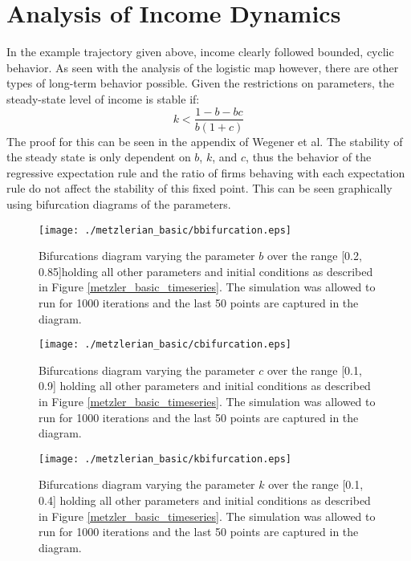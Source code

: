 \section{Analysis of Income Dynamics}
In the example trajectory given above, income clearly followed bounded, cyclic behavior. As seen with the analysis of the logistic map however, there are other types of long-term behavior possible. Given the restrictions on parameters, the steady-state level of income is stable if:
\begin{equation}
    k<\frac{1-b-bc}{b(1+c)}
\end{equation}
The proof for this can be seen in the appendix of Wegener et al.\autocite{Wegener2009} The stability of the steady state is only dependent on $b$, $k$, and $c$, thus the behavior of the regressive expectation rule and the ratio of firms behaving with each expectation rule do not affect the stability of this fixed point. This can be seen graphically using bifurcation diagrams of the parameters.

\begin{figure}
    \centering
    \texttt{[image: ./metzlerian\_basic/bbifurcation.eps]}
    \caption{Bifurcations diagram varying the parameter $b$ over the range [0.2, 0.85]holding all other parameters and initial conditions as described in Figure \ref{metzler_basic_timeseries}. The simulation was allowed to run for 1000 iterations and the last 50 points are captured in the diagram.}
    \label{metzler_basic_bbifurcation}
\end{figure} 

\begin{figure}
    \centering
    \texttt{[image: ./metzlerian\_basic/cbifurcation.eps]}
    \caption{Bifurcations diagram varying the parameter $c$ over the range [0.1, 0.9] holding all other parameters and initial conditions as described in Figure \ref{metzler_basic_timeseries}. The simulation was allowed to run for 1000 iterations and the last 50 points are captured in the diagram.}
    \label{metzler_basic_cbifurcation}
\end{figure} 

\begin{figure}
    \centering
    \texttt{[image: ./metzlerian\_basic/kbifurcation.eps]}
    \caption{Bifurcations diagram varying the parameter $k$ over the range [0.1, 0.4] holding all other parameters and initial conditions as described in Figure \ref{metzler_basic_timeseries}. The simulation was allowed to run for 1000 iterations and the last 50 points are captured in the diagram.}
    \label{metzler_basic_kbifurcation}
\end{figure} 

